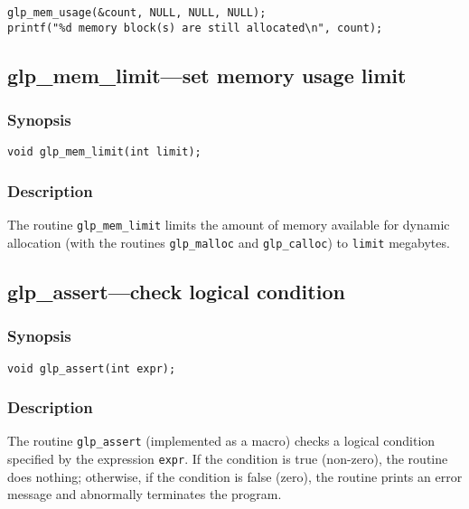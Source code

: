 \begin{verbatim}
glp_mem_usage(&count, NULL, NULL, NULL);
printf("%d memory block(s) are still allocated\n", count);
\end{verbatim}

\subsection{glp\_mem\_limit---set memory usage limit}

\subsubsection*{Synopsis}

\begin{verbatim}
void glp_mem_limit(int limit);
\end{verbatim}

\subsubsection*{Description}

The routine \verb|glp_mem_limit| limits the amount of memory available
for dynamic allocation (with the routines \verb|glp_malloc| and
\verb|glp_calloc|) to \verb|limit| megabytes.

\subsection{glp\_assert---check logical condition}

\subsubsection*{Synopsis}

\begin{verbatim}
void glp_assert(int expr);
\end{verbatim}

\subsubsection*{Description}

The routine \verb|glp_assert| (implemented as a macro) checks
a logical condition specified by the expression \verb|expr|. If the
condition is true (non-zero), the routine does nothing; otherwise, if
the condition is false (zero), the routine prints an error message and
abnormally terminates the program.

